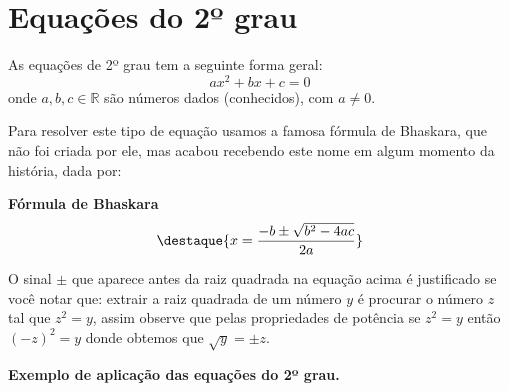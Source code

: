 \section{Equações do 2º grau}

\colorbox{azul}{
 \begin{minipage}{0.9\linewidth}
 \begin{center}
   As equações de 2º grau tem a seguinte forma geral:
   \[ax^2 + bx + c = 0\]
  onde $a, b, c \in \mathbb{R}$ são números dados (conhecidos), com $a \neq 0 $.
 \end{center}
 \end{minipage}}

 \vskip0.3cm

Para resolver este tipo de equação usamos a famosa fórmula de Bhaskara, que não foi criada por ele, mas acabou recebendo este nome em algum momento da história, dada por:

 \vskip0.3cm
 \begin{center}
 \textbf{Fórmula de Bhaskara}
   \[\destaque{x= \frac{-b \pm \sqrt{b^2 - 4ac}}{2a}}\]
 \end{center}

O sinal $\pm$ que aparece antes da raiz quadrada na equação acima é justificado se você notar que: extrair a raiz quadrada de um número $y$ é procurar o número $z$ tal que $z^2 = y$, assim observe que pelas propriedades de potência se $z^2= y$ então $(-z)^2= y$ donde obtemos que $\sqrt{y} = \pm z$.

\vskip0.3cm

\textbf {Exemplo de aplicação das equações do 2º grau.}

